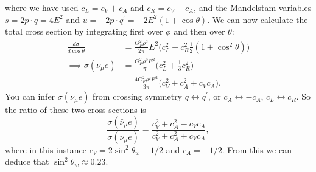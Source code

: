 \documentclass[a4paper,12pt]{article}
\begin{document}
where we have used $c_L = c_V + c_A$ and $c_R = c_V-c_A$, and the Mandelstam variables $s=2 p \cdot q = 4E^2$ and $u=-2p \cdot q^\prime = -2E^2(1+ \cos\theta)$. We can now calculate the total cross section by integrating first over $\phi$ and then over $\theta$:
\begin{equation}
\begin{split}
\frac{d\sigma}{d\cos\theta} &= \frac{G_F^2 \rho^2}{2 \pi} E^2 \big(c_L^2 + c_R^2\frac{1}{2}(1 + \cos^2\theta)\big) \\
\implies \sigma(\nu_\mu e) &= \frac{G_F^2 \rho^2 E^2}{\pi} \big(c_L^2 + \frac{1}{3}c_R^2\big) \\
&= \frac{4G_F^2 \rho^2E^2}{3 \pi}\big(c_V^2 + c_A^2 + c_V c_A\big).
\end{split}
\end{equation}
You can infer $\sigma(\bar{\nu}_\mu e)$ from crossing symmetry $q \leftrightarrow q^\prime$, or $c_A \leftrightarrow -c_A$, $c_L \leftrightarrow c_R$. So the ratio of these two cross sections is
\begin{equation}
\frac{\sigma(\bar{\nu}_\mu e)}{\sigma(\nu_\mu e)} = \frac{c_V^2 + c_A^2 - c_Vc_A}{c_V^2 + c_A^2 + c_V c_A},
\end{equation}
where in this instance $c_V = 2 \sin^2\theta_w -1/2$ and $c_A = -1/2$. From this we can deduce that $\sin^2\theta_w \approx 0.23$. 
\end{document}
